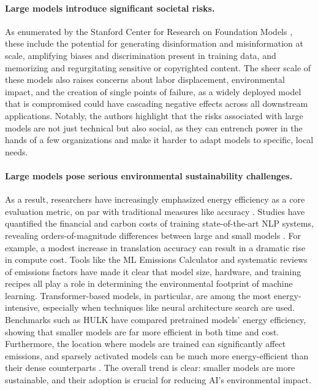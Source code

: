\paragraph{Large models introduce significant societal risks.} As enumerated by the Stanford Center for Research on Foundation Models \citet{bommasani2021foundation}, these include the potential for generating disinformation and misinformation at scale, amplifying biases and discrimination present in training data, and memorizing and regurgitating sensitive or copyrighted content. The sheer scale of these models also raises concerns about labor displacement, environmental impact, and the creation of single points of failure, as a widely deployed model that is compromised could have cascading negative effects across all downstream applications. Notably, the authors highlight that the risks associated with large models are not just technical but also social, as they can entrench power in the hands of a few organizations and make it harder to adapt models to specific, local needs.

\paragraph{Large models pose serious environmental sustainability challenges.} As a result, researchers have increasingly emphasized energy efficiency as a core evaluation metric, on par with traditional measures like accuracy \citep{schwartz2020greenai}. Studies have quantified the financial and carbon costs of training state-of-the-art NLP systems, revealing orders-of-magnitude differences between large and small models \citep{strubell2019energy}. For example, a modest increase in translation accuracy can result in a dramatic rise in compute cost. Tools like the ML Emissions Calculator \citep{lacoste2019quantifying} and systematic reviews of emissions factors \citep{luccioni2023counting} have made it clear that model size, hardware, and training recipes all play a role in determining the environmental footprint of machine learning. Transformer-based models, in particular, are among the most energy-intensive, especially when techniques like neural architecture search are used. Benchmarks such as HULK \citep{zhou2021hulk} have compared pretrained models' energy efficiency, showing that smaller models are far more efficient in both time and cost. Furthermore, the location where models are trained can significantly affect emissions, and sparsely activated models can be much more energy-efficient than their dense counterparts \citep{patterson2021carbon}. The overall trend is clear: smaller models are more sustainable, and their adoption is crucial for reducing AI's environmental impact.

